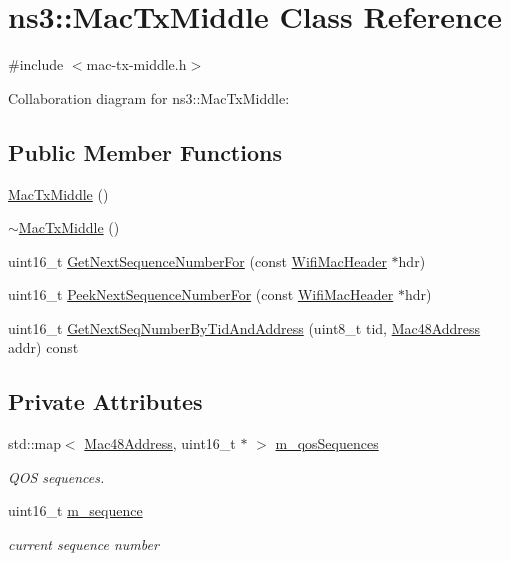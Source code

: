 \hypertarget{classns3_1_1MacTxMiddle}{}\section{ns3\+:\+:Mac\+Tx\+Middle Class Reference}
\label{classns3_1_1MacTxMiddle}


{\ttfamily \#include $<$mac-\/tx-\/middle.\+h$>$}



Collaboration diagram for ns3\+:\+:Mac\+Tx\+Middle\+:
\subsection*{Public Member Functions}
\begin{DoxyCompactItemize}
\item 
\hyperlink{classns3_1_1MacTxMiddle_ab55ef1d097603437bb6d3210db8fb65f}{Mac\+Tx\+Middle} ()
\item 
\hyperlink{classns3_1_1MacTxMiddle_a16daf84684222690ef1d14c2be9021d7}{$\sim$\+Mac\+Tx\+Middle} ()
\item 
uint16\+\_\+t \hyperlink{classns3_1_1MacTxMiddle_a791d277bf45e2b45b57b2fdb9417cc25}{Get\+Next\+Sequence\+Number\+For} (const \hyperlink{classns3_1_1WifiMacHeader}{Wifi\+Mac\+Header} $\ast$hdr)
\item 
uint16\+\_\+t \hyperlink{classns3_1_1MacTxMiddle_a9ae98e7d98efae080431b7fe3b0a9a2d}{Peek\+Next\+Sequence\+Number\+For} (const \hyperlink{classns3_1_1WifiMacHeader}{Wifi\+Mac\+Header} $\ast$hdr)
\item 
uint16\+\_\+t \hyperlink{classns3_1_1MacTxMiddle_ae25a26b35efc9a8f29f27d1348f8514c}{Get\+Next\+Seq\+Number\+By\+Tid\+And\+Address} (uint8\+\_\+t tid, \hyperlink{classns3_1_1Mac48Address}{Mac48\+Address} addr) const 
\end{DoxyCompactItemize}
\subsection*{Private Attributes}
\begin{DoxyCompactItemize}
\item 
std\+::map$<$ \hyperlink{classns3_1_1Mac48Address}{Mac48\+Address}, uint16\+\_\+t $\ast$ $>$ \hyperlink{classns3_1_1MacTxMiddle_ac772ae494e77aa273bece9a75f002202}{m\+\_\+qos\+Sequences}
\begin{DoxyCompactList}\small\item\em Q\+OS sequences. \end{DoxyCompactList}\item 
uint16\+\_\+t \hyperlink{classns3_1_1MacTxMiddle_a5b304f299ca20dc220dece4cab00d322}{m\+\_\+sequence}
\begin{DoxyCompactList}\small\item\em current sequence number \end{DoxyCompactList}\end{DoxyCompactItemize}


